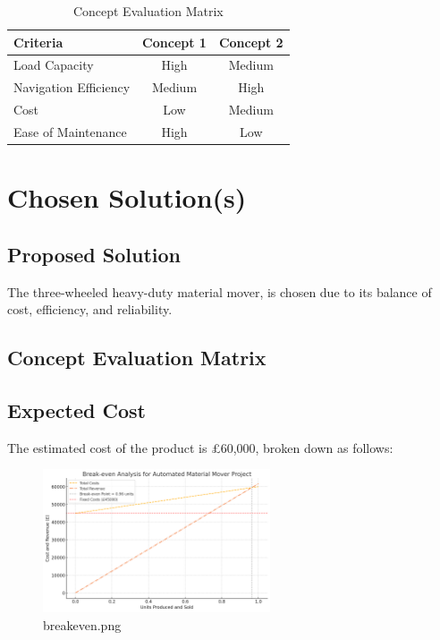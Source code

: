 \documentclass[12pt]{article}
\begin{document}
\begin{table}[h!]
\centering
\caption{Concept Evaluation Matrix}
\begin{tabular}{@{}lcc@{}}
\toprule
\textbf{Criteria}      & \textbf{Concept 1} & \textbf{Concept 2} \\ \midrule
Load Capacity          & High               & Medium             \\
Navigation Efficiency  & Medium             & High               \\
Cost                   & Low                & Medium             \\
Ease of Maintenance    & High               & Low                \\ \bottomrule
\end{tabular}
\label{tab:concept_evaluation}
\end{table}

\section{Chosen Solution(s)}

\subsection{Proposed Solution}
The three-wheeled heavy-duty material mover, is chosen due to its balance of cost, efficiency, and reliability.
\subsection{Concept Evaluation Matrix}

\subsection{Expected Cost}

 
The estimated cost of the product is £60,000, broken down as follows:


\begin{figure}[h!]
    \centering
     \includegraphics[width=0.6\textwidth]{breakeven.png}
        \caption{breakeven.png}
         \label{fig:timeline}
\end{figure}
\end{document}
